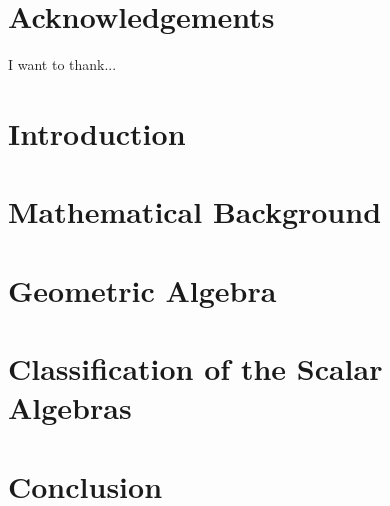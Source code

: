 \documentclass[12pt]{report}
\theoremstyle{definition}
\theoremstyle{definition}
\theoremstyle{remark}
\begin{document}




\chapter*{Acknowledgements}
I want to thank...

\tableofcontents
\listoffigures
\listoftables

\chapter{Introduction}


\chapter{Mathematical Background}


\chapter{Geometric Algebra}


\chapter{Classification of the Scalar Algebras}


\chapter{Conclusion}


\printbibliography
\end{document}
